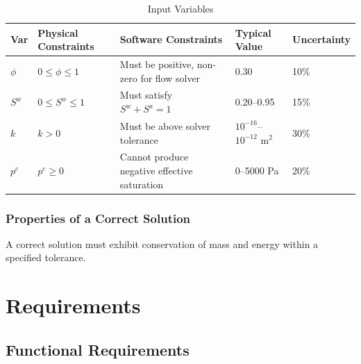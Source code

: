 \documentclass[12pt]{article}
\begin{document}
\begin{table}[H]
\caption{Input Variables} \label{TblInputVar}
\renewcommand{\arraystretch}{1.2}
\centering
\begin{tabular}{l l l l l}
\toprule
\textbf{Var} & \textbf{Physical Constraints} & \textbf{Software Constraints} &
\textbf{Typical Value} & \textbf{Uncertainty}\\
\midrule

$\phi$ & $0 \le \phi \le 1$ & Must be positive, non-zero for flow solver & 0.30 & 10\% \\

$S^w$ & $0 \le S^w \le 1$ & Must satisfy $S^w + S^a = 1$ & 0.20–0.95 & 15\% \\

$k$ & $k > 0$ & Must be above solver tolerance & $10^{-16}$–$10^{-12}$ m$^2$ & 30\% \\

$p^c$ & $p^c \ge 0$ & Cannot produce negative effective saturation & 0–5000 Pa & 20\% \\

\bottomrule
\end{tabular}
\end{table}


\subsubsection{Properties of a Correct Solution} \label{sec_CorrectSolution}

A correct solution must exhibit conservation of mass and energy within a specified tolerance.

\section{Requirements}

\subsection{Functional Requirements}
\end{document}
